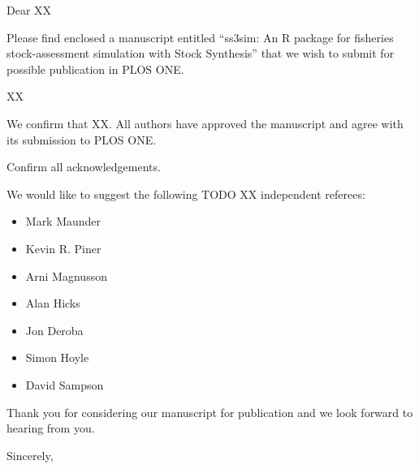 \documentclass[letterpaper,12pt]{letter}
\begin{document}
\begin{letter}{}
\pagestyle{empty}
\opening{Dear XX}

Please find enclosed a manuscript entitled ``ss3sim: An R package for fisheries
stock-assessment simulation with Stock Synthesis'' that we wish to submit for
possible publication in PLOS ONE.

XX

We confirm that XX. All authors have approved the manuscript and agree with its
submission to PLOS ONE.

Confirm all acknowledgements.

We would like to suggest the following TODO XX independent referees:

\begin{itemize}
  \item Mark Maunder
  \item Kevin R. Piner
  \item Arni Magnusson
  \item Alan Hicks
  \item Jon Deroba
  \item Simon Hoyle
  \item David Sampson
\end{itemize}

Thank you for considering our manuscript for publication and we look forward to
hearing from you.

\vspace{14mm}
\closing{Sincerely,\\
}

\end{letter}
\end{document}
